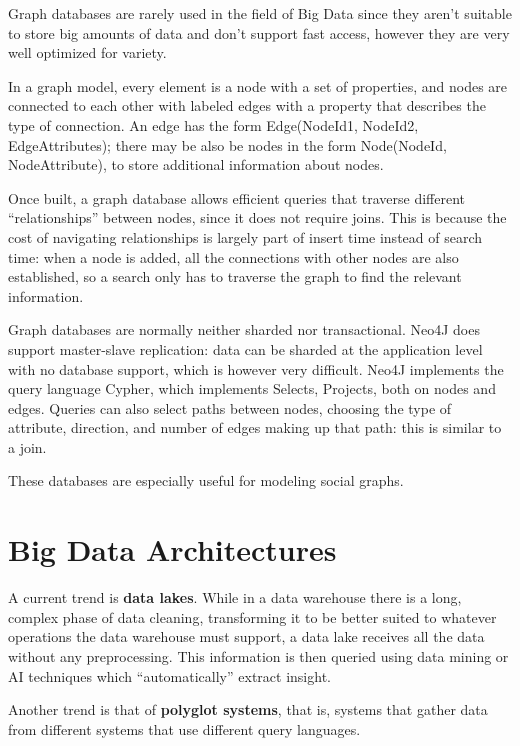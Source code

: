 Graph databases are rarely used in the field of Big Data since they aren't suitable to store big amounts of data and don't support fast access, however they are very well optimized for variety.

In a graph model, every element is a node with a set of properties, and nodes are connected to each other with labeled edges with a property that describes the type of connection. An edge has the form Edge(NodeId1, NodeId2, EdgeAttributes); there may be also be nodes in the form Node(NodeId, NodeAttribute), to store additional information about nodes. 

Once built, a graph database allows efficient queries that traverse different ``relationships'' between nodes, since it does not require joins. This is because the cost of navigating relationships is largely part of insert time instead of search time: when a node is added, all the connections with other nodes are also established, so a search only has to traverse the graph to find the relevant information.

Graph databases are normally neither sharded nor transactional. Neo4J does support master-slave replication: data can be sharded at the application level with no database support, which is however very difficult. Neo4J implements the query language Cypher, which implements Selects, Projects, both on nodes and edges. Queries can also select paths between nodes, choosing the type of attribute, direction, and number of edges making up that path: this is similar to a join.

These databases are especially useful for modeling social graphs.

\section{Big Data Architectures}

A current trend is \textbf{data lakes}. While in a data warehouse there is a long, complex phase of data cleaning, transforming it to be better suited to whatever operations the data warehouse must support, a data lake receives all the data without any preprocessing. This information is then queried using data mining or AI techniques which ``automatically'' extract insight.

Another trend is that of \textbf{polyglot systems}, that is, systems that gather data from different systems that use different query languages. 